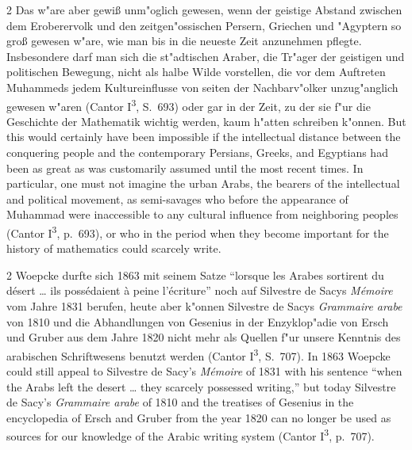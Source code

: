 \documentclass[10pt,a4paper]{article}
\renewcommand{\switchcolumn}{\syncronize\nointerlineskip\columnbreak}
\newcommand{\enquote}[1]{``#1''}
\begin{document}
\begin{paracol}{2}
Das w"are aber gewi\ss{} unm"oglich gewesen, wenn der geistige Abstand zwischen dem Eroberervolk und den zeitgen"ossischen Persern, Griechen und "Agyptern so gro\ss{} gewesen w"are, wie man bis in die neueste Zeit anzunehmen pflegte. Insbesondere darf man sich die st"adtischen Araber, die Tr"ager der geistigen und politischen Bewegung, nicht als halbe Wilde vorstellen, die vor dem Auftreten Muhammeds jedem Kultureinflusse von seiten der Nachbarv"olker unzug"anglich gewesen w"aren (Cantor I\textsuperscript{3}, S.\ 693) oder gar in der Zeit, zu der sie f"ur die Geschichte der Mathematik wichtig werden, kaum h"atten schreiben k"onnen.
\switchcolumn
But this would certainly have been impossible if the intellectual distance between the conquering people and the contemporary Persians, Greeks, and Egyptians had been as great as was customarily assumed until the most recent times. In particular, one must not imagine the urban Arabs, the bearers of the intellectual and political movement, as semi-savages who before the appearance of Muhammad were inaccessible to any cultural influence from neighboring peoples (Cantor I\textsuperscript{3}, p.\ 693), or who in the period when they become important for the history of mathematics could scarcely write.
\end{paracol}

\begin{paracol}{2}
Woepcke durfte sich 1863 mit seinem Satze \enquote{lorsque les Arabes sortirent du d\'esert \ldots{} ils poss\'edaient \`a peine l'\'ecriture} noch auf Silvestre de Sacys \textit{M\'emoire} vom Jahre 1831 berufen, heute aber k"onnen Silvestre de Sacys \textit{Grammaire arabe} von 1810 und die Abhandlungen von Gesenius in der Enzyklop"adie von Ersch und Gruber aus dem Jahre 1820 nicht mehr als Quellen f"ur unsere Kenntnis des arabischen Schriftwesens benutzt werden (Cantor I\textsuperscript{3}, S.\ 707).
\switchcolumn
In 1863 Woepcke could still appeal to Silvestre de Sacy's \textit{M\'emoire} of 1831 with his sentence ``when the Arabs left the desert \ldots{} they scarcely possessed writing,'' but today Silvestre de Sacy's \textit{Grammaire arabe} of 1810 and the treatises of Gesenius in the encyclopedia of Ersch and Gruber from the year 1820 can no longer be used as sources for our knowledge of the Arabic writing system (Cantor I\textsuperscript{3}, p.\ 707).
\end{paracol}
\end{document}
